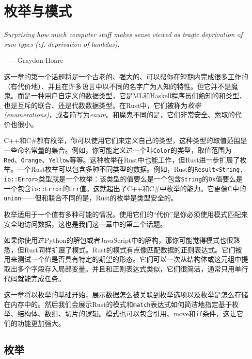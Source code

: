 \chapter{枚举与模式}\label{ch10}

\emph{Surprising how much computer stuff makes sense viewed as tragic deprivation of sum types (cf. deprivation of lambdas).}

\begin{flushright}
    ——Graydon Hoare
\end{flushright}

这一章的第一个话题将是一个古老的、强大的、可以帮你在短期内完成很多工作的（有代价地）、并且在许多语言中以不同的名字广为人知的特性。但它并不是魔鬼。而是一种用户自定义的数据类型，它是ML和Haskell程序员们熟知的和类型、也是互斥的联合、还是代数数据类型。在Rust中，它们被称为\emph{枚举(enumerations)}，或者简写为\emph{enum}。和魔鬼不同的是，它们非常安全、索取的代价也很小。

C++和C\#都有枚举，你可以使用它们来定义自己的类型，这种类型的取值范围是一些命名常量的集合。例如，你可能定义过一个叫\texttt{Color}的类型，取值范围为\texttt{Red}、\texttt{Orange}、\texttt{Yellow}等等。这种枚举在Rust中也能工作，但Rust进一步扩展了枚举。一个Rust枚举可以包含多种不同类型的数据。例如，Rust的\texttt{Result<String, io::Error>}类型就是一个枚举：该类型的值要么是一个包含\texttt{String}的\texttt{Ok}值要么是一个包含\texttt{io::Error}的\texttt{Err}值。这就超出了C++和C\#中枚举的能力。它更像C中的\texttt{union}——但和联合不同的是，Rust的枚举是类型安全的。

枚举适用于一个值有多种可能的情况。使用它们的“代价”是你必须使用模式匹配来安全地访问数据，这也是我们这一章中的第二个话题。

如果你使用过Python的解包或者JavaScript中的解构，那你可能觉得模式也很熟悉，但Rust同样扩展了模式。Rust的模式有点像匹配数据的正则表达式。它们被用来测试一个值是否具有特定的期望的形态。它们可以一次从结构体或这元组中提取出多个字段存入局部变量。并且和正则表达式类似，它们很简洁，通常只用单行代码就能完成任务。

这一章将以枚举的基础开始，展示数据怎么被关联到枚举选项以及枚举是怎么存储在内存中的。然后我们会展示Rust的模式和\texttt{match}表达式如何简洁地指定基于枚举、结构体、数组、切片的逻辑。模式也可以包含引用、move和\texttt{if}条件，这让它们的功能更加强大。

\section{枚举}\label{enum}

